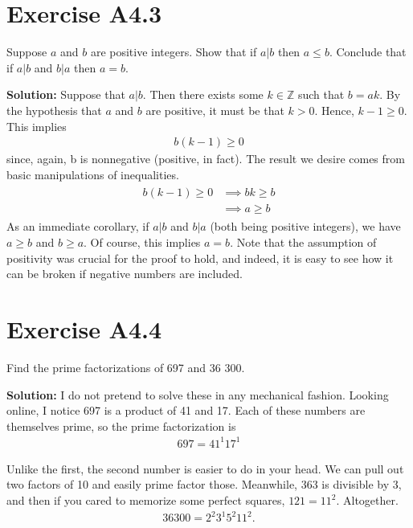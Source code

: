 \documentclass{book}
\begin{document}
\section*{Exercise A4.3} 
    Suppose $a$ and $b$ are positive integers. Show that if $a|b$ then $a\leq b$. Conclude that if $a|b$ and $b|a$ then $a=b$.
    
    \textbf{Solution:} Suppose that $a|b$. Then there exists some $k\in \mathbb{Z}$ such that $b = ak$. By the hypothesis that $a$ and $b$ are positive, it must be that $k>0$. Hence, $k-1\geq0$. This implies
    \begin{align}
        b(k-1) \geq 0
    \end{align}
    since, again, b is nonnegative (positive, in fact). The result we desire comes from basic manipulations of inequalities.
    \begin{align}
    \begin{aligned}
        b(k-1) \geq 0 &\implies bk \geq b \\
        &\implies a \geq b
    \end{aligned}
    \end{align}
    As an immediate corollary, if $a|b$ and $b|a$ (both being positive integers), we have $a\geq b$ and $b\geq a$. Of course, this implies $a = b$. Note that the assumption of positivity was crucial for the proof to hold, and indeed, it is easy to see how it can be broken if negative numbers are included.

\section*{Exercise A4.4}
    Find the prime factorizations of 697 and 36 300.
    
    \textbf{Solution:} I do not pretend to solve these in any mechanical fashion. Looking online, I notice 697 is a product of 41 and 17. Each of these numbers are themselves prime, so the prime factorization is 
    \begin{align}
        697 =41^1 17^1
    \end{align}
    
    Unlike the first, the second number is easier to do in your head. We can pull out two factors of 10 and easily prime factor those. Meanwhile, 363 is divisible by 3, and then if you cared to memorize some perfect squares, $121= 11^2$. Altogether.
    \begin{align}
        36300 = 2^2 3^1 5^2 11^2.
    \end{align}
\end{document}
